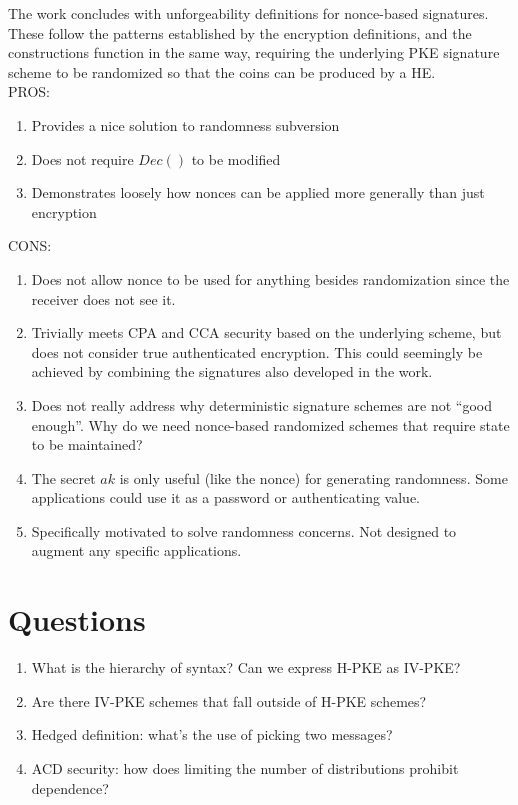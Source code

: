 \documentclass[11pt, pdftex]{article}
\begin{document}
The work concludes with unforgeability definitions for nonce-based signatures.  These follow the patterns established by the encryption
definitions, and the constructions function in the same way, requiring the underlying PKE signature scheme to be randomized so
that the coins can be produced by a HE.\\

\noindent PROS:
\begin{enumerate}
\item Provides a nice solution to randomness subversion
\item Does not require $Dec()$ to be modified
\item Demonstrates loosely how nonces can be applied more generally than just encryption
\end{enumerate}

\noindent CONS:
\begin{enumerate}
\item Does not allow nonce to be used for anything besides randomization since the receiver does not see it.
\item Trivially meets CPA and CCA security based on the underlying scheme, but does not consider true authenticated encryption.
This could seemingly be achieved by combining the signatures also developed in the work.
\item Does not really address why deterministic signature schemes are not ``good enough''.  Why do we need nonce-based randomized schemes
that require state to be maintained?
\item The secret $ak$ is only useful (like the nonce) for generating randomness.  Some applications could use it as a password or
authenticating value.
\item Specifically motivated to solve randomness concerns.  Not designed to augment any specific applications.
\end{enumerate}



\section{Questions}
\begin{enumerate}
\item What is the hierarchy of syntax?  Can we express H-PKE as IV-PKE? 
\item Are there IV-PKE schemes that fall outside of H-PKE schemes?
\item Hedged definition: what's the use of picking two messages?
\item ACD security: how does limiting the number of distributions prohibit dependence?
\end{enumerate}
\end{document}
